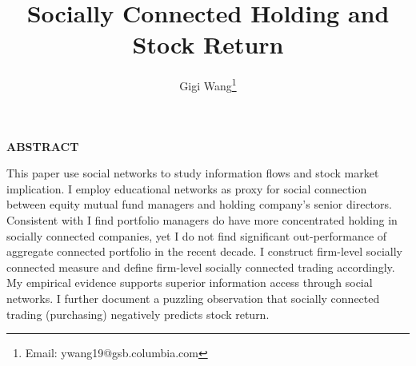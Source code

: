 \documentclass[11pt]{article}
\begin{document}
\onehalfspacing      %
\renewcommand{\footnote}{\endnote}  %

\author{Gigi Wang\thanks{Email: ywang19@gsb.columbia.com}}

\title{\huge \bf Socially Connected Holding and Stock Return}

\date{}              %


\maketitle
\thispagestyle{empty}

\bigskip

\centerline{\bf ABSTRACT}

\begin{doublespace}  %
  \noindent 
  This paper use social networks to study information flows and stock market implication. I employ educational networks as proxy for social connection between equity mutual fund managers and holding company's senior directors. Consistent with \cite{cohen2008small} I find portfolio managers do have more concentrated holding in socially connected companies, yet I do not find significant out-performance of aggregate connected portfolio in the recent decade. I construct firm-level socially connected measure and define firm-level socially connected trading accordingly. My empirical evidence supports superior information access through social networks. I further document a puzzling observation that socially connected trading (purchasing) negatively predicts stock return. 
\end{doublespace}

\medskip
\clearpage
\end{document}

